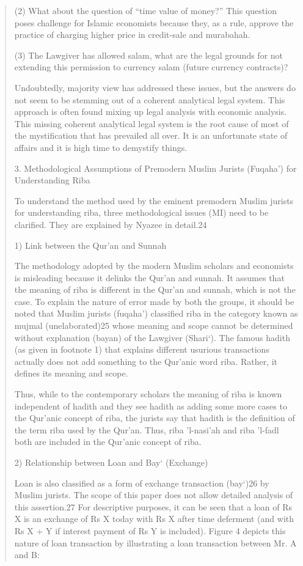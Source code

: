 \begin{quote}
(2) What about the question of “time value of money?” This question poses challenge for Islamic economists because they, as a rule, approve the practice of charging higher price in credit-sale and murabahah.

(3) The Lawgiver has allowed salam, what are the legal grounds for not extending this permission to currency salam (future currency contracts)?

Undoubtedly, majority view has addressed these issues, but the answers do not seem to be stemming out of a coherent analytical legal system. This approach is often found mixing up legal analysis with economic analysis. This missing coherent analytical legal system is the root cause of most of the mystification that has prevailed all over. It is an unfortunate state of affairs and it is high time to demystify things.

3. Methodological Assumptions of Premodern Muslim Jurists (Fuqaha') for Understanding Riba

To understand the method used by the eminent premodern Muslim jurists for understanding riba, three methodological issues (MI) need to be clarified. They are explained by Nyazee in detail.24

1) Link between the Qur'an and Sunnah

The methodology adopted by the modern Muslim scholars and economists is misleading because it delinks the Qur'an and sunnah. It assumes that the meaning of riba is different in the Qur'an and sunnah, which is not the case. To explain the nature of error made by both the groups, it should be noted that Muslim jurists (fuqaha') classified riba in the category known as mujmal (unelaborated)25 whose meaning and scope cannot be determined without explanation (bayan) of the Lawgiver (Shari‘). The famous hadith (as given in footnote 1) that explains different usurious transactions actually does not add something to the Qur'anic word riba. Rather, it defines its meaning and scope.

Thus, while to the contemporary scholars the meaning of riba is known independent of hadith and they see hadith as adding some more cases to the Qur'anic concept of riba, the jurists say that hadith is the definition of the term riba used by the Qur'an. Thus, riba 'l-nasi'ah and riba 'l-fadl both are included in the Qur'anic concept of riba.

2) Relationship between Loan and Bay‘ (Exchange)

Loan is also classified as a form of exchange transaction (bay‘)26 by Muslim jurists. The scope of this paper does not allow detailed analysis of this assertion.27 For descriptive purposes, it can be seen that a loan of Rs X is an exchange of Rs X today with Rs X after time deferment (and with Rs X + Y if interest payment of Rs Y is included). Figure 4 depicts this nature of loan transaction by illustrating a loan transaction between Mr. A and B:


\end{quote}
